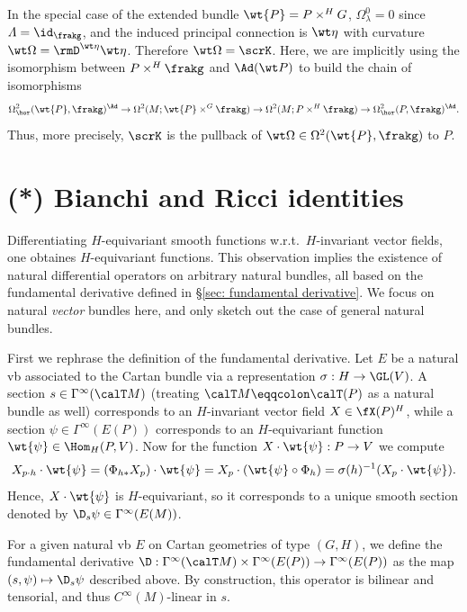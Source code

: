 \begin{rem}
    In the special case of the extended bundle $\wt{P}=P\times^H G$, $\Omega^0_\lambda=0$ since $\varLambda=\id_\frakg$, and the induced principal connection is $\wt\eta$ with curvature $\wt\Omega=\rmD^{\wt\eta}\wt\eta$. Therefore $\wt\Omega=\scrK$. Here, we are implicitly using the isomorphism between $P\times^H\frakg$ and $\Ad(\wt P)$ to build the chain of isomorphisms
    \[\Omega^2_{\hor}(\wt{P},\frakg)^{\Ad}\to \Omega^2(M;\wt{P}\times^G \frakg)\to \Omega^2(M;P\times^H\frakg)\to \Omega^2_{\hor}(P,\frakg)^{\Ad}.\]
    Thus, more precisely, $\scrK$ is the pullback of $\wt\Omega\in\Omega^2(\wt{P},\frakg)$ to $P$.
\end{rem}







\section{(*) Bianchi and Ricci identities}\label{sec: bianchi and ricci}


Differentiating $H$-equivariant smooth functions w.r.t.\ $H$-invariant vector fields, one obtaines $H$-equivariant functions. This observation implies the existence of natural differential operators on arbitrary natural bundles, all based on the fundamental derivative defined in \S\ref{sec: fundamental derivative}. We focus on natural \emph{vector} bundles here, and only sketch out the case of general natural bundles.

First we rephrase the definition of the fundamental derivative. Let $E$ be a natural \gls{vb} associated to the Cartan bundle via a representation $\sigma:H\to \GL(V)$. A section $s\in\Gamma^\infty(\calT M)$ (treating $\calT M\eqqcolon \calT(P)$ as a natural bundle as well) corresponds to an $H$-invariant vector field $X\in\fX(P)^H$, while a section $\psi\in\Gamma^\infty(E(P))$ corresponds to an $H$-equivariant function $\wt{\psi}\in\Hom_H(P,V)$. Now for the function $X\cdot \wt{\psi}:P\to V$ we compute 
\[X_{p\cdot h}\cdot \wt{\psi}=(\Phi_{h\ast} X_p)\cdot \wt{\psi}=X_p\cdot (\wt{\psi}\circ \Phi_h)=\sigma(h)^{-1}(X_p\cdot \wt{\psi}).\]
Hence, $X\cdot\wt{\psi}$ is $H$-equivariant, so it corresponds to a unique smooth section denoted by $\D_s \psi\in\Gamma^\infty(E(M))$.


\begin{defn}
    For a given natural \gls{vb} $E$ on Cartan geometries of type $(G,H)$, we define the fundamental derivative $\D:\Gamma^\infty(\calT M)\times\Gamma^\infty(E(P))\to \Gamma^\infty(E(P))$ as the map $(s,\psi)\mapsto \D_s \psi$ described above.  By construction, this operator is bilinear and tensorial, and thus $C^\infty(M)$-linear in $s$.
\end{defn}

